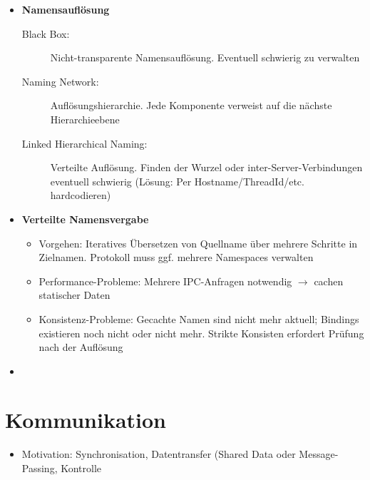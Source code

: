 \begin{itemize}
	\item \textbf{Namensauflösung}
	\begin{description}
		\item[Black Box:] Nicht-transparente Namensauflösung. Eventuell schwierig zu verwalten
		\item[Naming Network:] Auflösungshierarchie. Jede Komponente verweist auf die nächste Hierarchieebene
		\item[Linked Hierarchical Naming:] Verteilte Auflösung. Finden der Wurzel oder inter-Server-Verbindungen eventuell schwierig (Lösung: Per Hostname/ThreadId/etc. hardcodieren)
	\end{description}
	\item \textbf{Verteilte Namensvergabe}
	\begin{itemize}
		\item Vorgehen: Iteratives Übersetzen von Quellname über mehrere Schritte in Zielnamen. Protokoll muss ggf. mehrere Namespaces verwalten
		\item Performance-Probleme: Mehrere IPC-Anfragen notwendig \(\rightarrow\) cachen statischer Daten
		\item Konsistenz-Probleme: Gecachte Namen sind nicht mehr aktuell; Bindings existieren noch nicht oder nicht mehr. Strikte Konsisten erfordert Prüfung nach der Auflösung
	\end{itemize}
	\item %
\end{itemize}



\section{Kommunikation}
\begin{itemize}
	\item Motivation: Synchronisation, Datentransfer (Shared Data oder Message-Passing, Kontrolle
\end{itemize}

